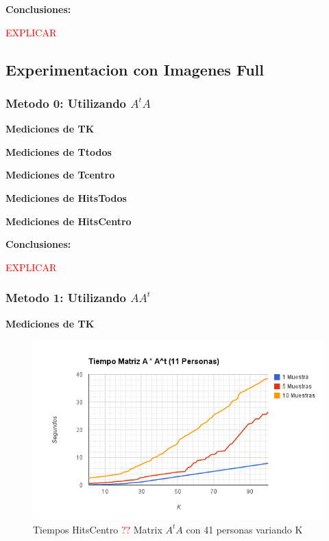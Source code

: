 \textbf{Conclusiones:}

\textcolor{red}{EXPLICAR}

\subsection{Experimentacion con Imagenes Full}

\subsubsection{Metodo 0: Utilizando $A^tA$}

\textbf{Mediciones de TK}

\textbf{Mediciones de Ttodos }

\textbf{Mediciones de Tcentro }

\textbf{Mediciones de HitsTodos }

\textbf{Mediciones de HitsCentro}

\textbf{Conclusiones:}

\textcolor{red}{EXPLICAR}

\subsubsection{Metodo 1: Utilizando $AA^t$}

\textbf{Mediciones de TK}

\begin{figure}[H]
\includegraphics[width=1\textwidth]{img/imagef1.png}
     \caption{Tiempos HitsCentro \textcolor{red}{??} Matrix $A^tA$ con 41 personas variando K}
     \label{fig:figura1}
\end{figure}

